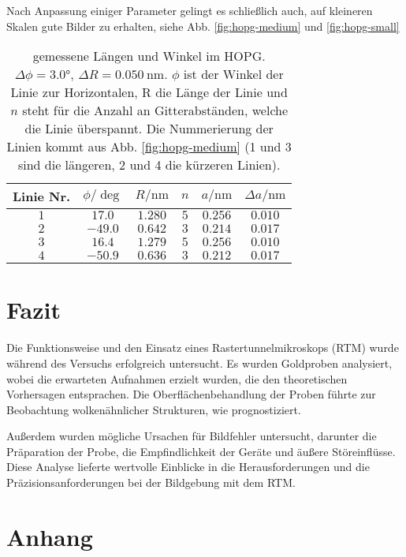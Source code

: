 \documentclass{article}
\begin{document}
Nach Anpassung einiger Parameter gelingt es schließlich auch, auf kleineren Skalen gute Bilder zu erhalten, siehe Abb. \ref{fig:hopg-medium} und \ref{fig:hopg-small}



\begin{table}[h]
    \centering
    \begin{tabular}{c||c|c|c|c|c}
        Linie Nr. & $\phi/\si{\deg}$ & $R/\si{\nm}$ & $n$ & $a/\si{\nm}$ & $\Delta a/\si{\nm}$ \\
        \hline
        $1$ & $17.0 $   & $1.280$ & $5$ & $0.256$ & $0.010$ \\
        $2$ & $-49.0$	& $0.642$ & $3$ & $0.214$ & $0.017$ \\
        $3$ & $16.4	$   & $1.279$ & $5$ & $0.256$ & $0.010$ \\
        $4$ & $-50.9$	& $0.636$ & $3$ & $0.212$ & $0.017$
    \end{tabular}
    \caption{gemessene Längen und Winkel im HOPG. $\Delta\phi=\ang{3.0}$, $\Delta R = \SI{0.050}{\nm}$. $\phi$ ist der Winkel der Linie zur Horizontalen, R die Länge der Linie und $n$ steht für die Anzahl an Gitterabständen, welche die Linie überspannt. Die Nummerierung der Linien kommt aus Abb. \ref{fig:hopg-medium} (1 und 3 sind die längeren, 2 und 4 die kürzeren Linien).}
    \label{tab:hopg-daten-1}
\end{table}



\clearpage
\section{Fazit}
Die Funktionsweise und den Einsatz eines Rastertunnelmikroskops (RTM) wurde während des Versuchs erfolgreich untersucht. Es wurden Goldproben analysiert, wobei die erwarteten Aufnahmen erzielt wurden, die den theoretischen Vorhersagen entsprachen. Die Oberflächenbehandlung der Proben führte zur Beobachtung wolkenähnlicher Strukturen, wie prognostiziert. 

Außerdem wurden mögliche Ursachen für Bildfehler untersucht, darunter die Präparation der Probe, die Empfindlichkeit der Geräte und äußere Störeinflüsse. Diese Analyse lieferte wertvolle Einblicke in die Herausforderungen und die Präzisionsanforderungen bei der Bildgebung mit dem RTM.







\clearpage
\section{Anhang}
\end{document}
